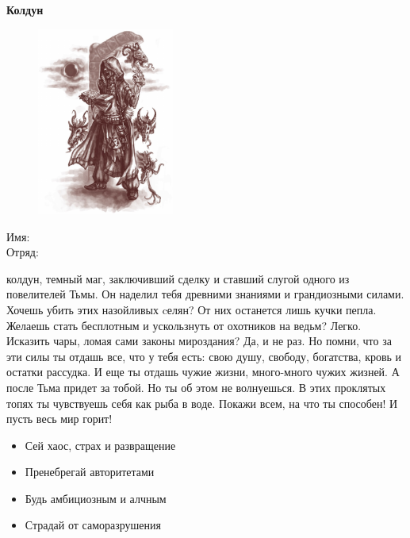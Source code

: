\documentclass[10pt,twoside]{report}
\begin{document}
\thispagestyle{empty}
\begin{center}
{\LARGE \textbf{Колдун}}

\begin{figure}[H]
  \includegraphics[width=170px]{images/warlock.png}
\end{figure}

\end{center}
\begin{description}
\item[Имя:]\hfill
\item[Отряд:]\hfill
\end{description}
\pagebreak

{ колдун, темный маг, заключивший сделку и ставший слугой одного из повелителей Тьмы. Он наделил тебя древними знаниями и грандиозными силами. Хочешь убить этих назойливых cелян? От них останется лишь кучки пепла. Желаешь стать бесплотным и ускользнуть от охотников на ведьм? Легко. Исказить чары, ломая сами законы мироздания? Да, и не раз. Но помни, что за эти силы ты отдашь все, что у тебя есть: свою душу, свободу, богатства, кровь и остатки рассудка. И еще ты отдашь чужие жизни, много-много чужих жизней. А после Тьма придет за тобой. Но ты об этом не волнуешься. В этих проклятых топях ты чувствуешь себя как рыба в воде. Покажи всем, на что ты способен! И пусть весь мир горит!}
\begin{itemize}[noitemsep]
  \item Сей хаос, страх и развращение
  \item Пренебрегай авторитетами
  \item Будь амбициозным и алчным
  \item Страдай от саморазрушения
\end{itemize}
\pagebreak



\end{document}
